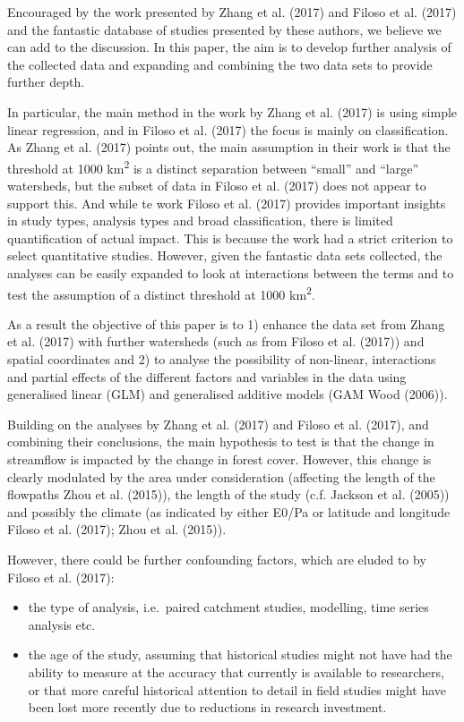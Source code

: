 \documentclass[]{elsarticle} %
\begin{document}
Encouraged by the work presented by Zhang et al. (2017) and Filoso et
al. (2017) and the fantastic database of studies presented by these
authors, we believe we can add to the discussion. In this paper, the aim
is to develop further analysis of the collected data and expanding and
combining the two data sets to provide further depth.

In particular, the main method in the work by Zhang et al. (2017) is
using simple linear regression, and in Filoso et al. (2017) the focus is
mainly on classification. As Zhang et al. (2017) points out, the main
assumption in their work is that the threshold at 1000
km\textsuperscript{2} is a distinct separation between ``small'' and
``large'' watersheds, but the subset of data in Filoso et al. (2017)
does not appear to support this. And while te work Filoso et al. (2017)
provides important insights in study types, analysis types and broad
classification, there is limited quantification of actual impact. This
is because the work had a strict criterion to select quantitative
studies. However, given the fantastic data sets collected, the analyses
can be easily expanded to look at interactions between the terms and to
test the assumption of a distinct threshold at 1000
km\textsuperscript{2}.

As a result the objective of this paper is to 1) enhance the data set
from Zhang et al. (2017) with further watersheds (such as from Filoso et
al. (2017)) and spatial coordinates and 2) to analyse the possibility of
non-linear, interactions and partial effects of the different factors
and variables in the data using generalised linear (GLM) and generalised
additive models (GAM Wood (2006)).

Building on the analyses by Zhang et al. (2017) and Filoso et al.
(2017), and combining their conclusions, the main hypothesis to test is
that the change in streamflow is impacted by the change in forest cover.
However, this change is clearly modulated by the area under
consideration (affecting the length of the flowpaths Zhou et al.
(2015)), the length of the study (c.f. Jackson et al. (2005)) and
possibly the climate (as indicated by either E0/Pa or latitude and
longitude Filoso et al. (2017); Zhou et al. (2015)).

However, there could be further confounding factors, which are eluded to
by Filoso et al. (2017):

\begin{itemize}
\item
  the type of analysis, i.e.~paired catchment studies, modelling, time
  series analysis etc.
\item
  the age of the study, assuming that historical studies might not have
  had the ability to measure at the accuracy that currently is available
  to researchers, or that more careful historical attention to detail in
  field studies might have been lost more recently due to reductions in
  research investment.
\end{itemize}
\end{document}
